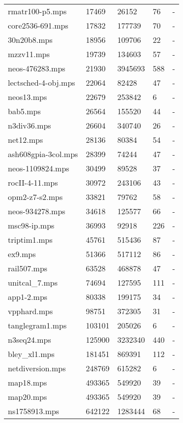 \documentclass{article}
\begin{document}
\begin{longtable}{|l |l |l |l |l |}
rmatr100-p5.mps&17469&26152&76&-\\
core2536-691.mps&17832&177739&70&-\\
30n20b8.mps&18956&109706&22&-\\
mzzv11.mps&19739&134603&57&-\\
neos-476283.mps&21930&3945693&588&-\\
lectsched-4-obj.mps&22064&82428&47&-\\
neos13.mps&22679&253842&6&-\\
bab5.mps&26564&155520&44&-\\
n3div36.mps&26604&340740&26&-\\
net12.mps&28136&80384&54&-\\
ash608gpia-3col.mps&28399&74244&47&-\\
neos-1109824.mps&30499&89528&37&-\\
rocII-4-11.mps&30972&243106&43&-\\
opm2-z7-s2.mps&33821&79762&58&-\\
neos-934278.mps&34618&125577&66&-\\
msc98-ip.mps&36993&92918&226&-\\
triptim1.mps&45761&515436&87&-\\
ex9.mps&51366&517112&86&-\\
rail507.mps&63528&468878&47&-\\
unitcal_7.mps&74694&127595&111&-\\
app1-2.mps&80338&199175&34&-\\
vpphard.mps&98751&372305&31&-\\
tanglegram1.mps&103101&205026&6&-\\
n3seq24.mps&125900&3232340&440&-\\
bley_xl1.mps&181451&869391&112&-\\
netdiversion.mps&248769&615282&6&-\\
map18.mps&493365&549920&39&-\\
map20.mps&493365&549920&39&-\\
ns1758913.mps&642122&1283444&68&-\\
\hline
\end{longtable}
\end{document}
